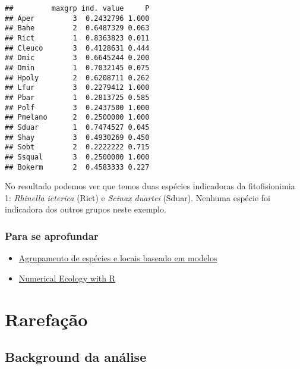 \documentclass[
]{book}
\providecommand{\tightlist}{%
  \setlength{\itemsep}{0pt}\setlength{\parskip}{0pt}}
\begin{document}
\begin{verbatim}
##         maxgrp ind. value     P
## Aper         3  0.2432796 1.000
## Bahe         2  0.6487329 0.063
## Rict         1  0.8363823 0.011
## Cleuco       3  0.4128631 0.444
## Dmic         3  0.6645244 0.200
## Dmin         1  0.7032145 0.075
## Hpoly        2  0.6208711 0.262
## Lfur         3  0.2279412 1.000
## Pbar         1  0.2813725 0.585
## Polf         3  0.2437500 1.000
## Pmelano      2  0.2500000 1.000
## Sduar        1  0.7474527 0.045
## Shay         3  0.4930269 0.450
## Sobt         2  0.2222222 0.715
## Ssqual       3  0.2500000 1.000
## Bokerm       2  0.4583333 0.227
\end{verbatim}

No resultado podemos ver que temos duas espécies indicadoras da fitofisionimia 1: \emph{Rhinella icterica} (Rict) e \emph{Scinax duartei} (Sduar). Nenhuma espécie foi indicadora dos outros grupos neste exemplo.

\hypertarget{para-se-aprofundar}{%
\subsection{Para se aprofundar}\label{para-se-aprofundar}}

\begin{itemize}
\tightlist
\item
  \href{https://www.sciencedirect.com/science/article/pii/S0304380010006393?casa_token=0YLFbVbGj1IAAAAA:RFcrLHBDdt-NY5gpxCEAqlc8LMG0ayzChpMvaOFQkE10ftg2Us6PafgMQCSmCZZ21eb430e_lWo}{Agrupamento de espécies e locais baseado em modelos}
\item
  \href{http://adn.biol.umontreal.ca/~numericalecology/numecolR/}{Numerical Ecology with R}
\end{itemize}

\hypertarget{rarefauxe7uxe3o}{%
\chapter{Rarefação}\label{rarefauxe7uxe3o}}

\hypertarget{background-da-anuxe1lise}{%
\section{Background da análise}\label{background-da-anuxe1lise}}
\end{document}
